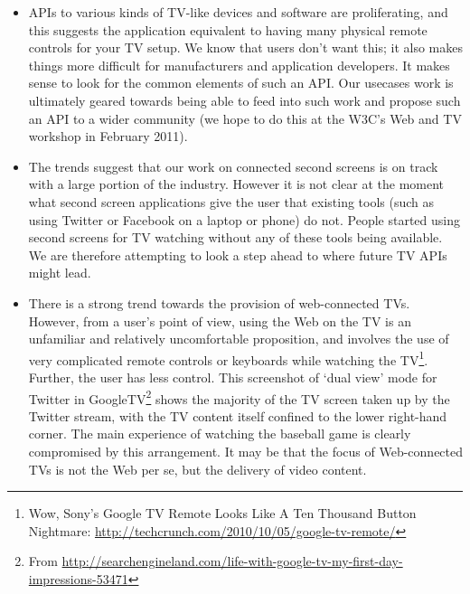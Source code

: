 \documentclass{notube}
\begin{document}
\begin{itemize}
\item{APIs to various kinds of TV-like devices and software are proliferating, and this suggests the application equivalent to having many physical remote controls for your TV setup. We know that users don't want this; it also makes things more difficult for manufacturers and application developers. It makes sense to look for the common elements of such an API. Our usecases work is ultimately geared towards being able to feed into such work and propose such an API to a wider community (we hope to do this at the W3C's Web and TV workshop in February 2011).}
\item{The trends suggest that our work on connected second screens is on track with a large portion of the industry. However it is not clear at the moment what second screen applications give the user that existing tools (such as using Twitter or Facebook on a laptop or phone) do not. People started using second screens for TV watching without any of these tools being available. We are therefore attempting to look a step ahead to where future TV APIs might lead.}
\item{There is a strong trend towards the provision of web-connected TVs. However, from a user's point of view, using the Web on the TV is an unfamiliar and relatively uncomfortable proposition, and involves the use of very complicated remote controls or keyboards while watching the TV\footnote{Wow, Sony's Google TV Remote Looks Like A Ten Thousand Button Nightmare: \url{http://techcrunch.com/2010/10/05/google-tv-remote/}}. Further, the user has less control. This screenshot of `dual view' mode for Twitter in GoogleTV\footnote{From \url{http://searchengineland.com/life-with-google-tv-my-first-day-impressions-53471}} shows the majority of the TV screen taken up by the Twitter stream, with the TV content itself confined to the lower right-hand corner. The main experience of watching the baseball game is clearly compromised by this arrangement. It may be that the focus of Web-connected TVs is not the Web per se, but the delivery of video content.} 
\end{itemize}
\end{document}
